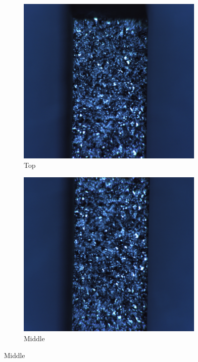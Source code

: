 \documentclass[11pt,a4paper]{article}
\begin{document}
\begin{figure} [ht]
\begin{subfigure}{0.335\textwidth}
\includegraphics[scale=0.27]{2 kn Top.png}
\caption{Top}
\end{subfigure}
\begin{subfigure}{0.335\textwidth}
\includegraphics[scale=0.27]{2 kN Middle.png}
\caption{Middle}
\end{subfigure}

\end{figure}
\end{document}
